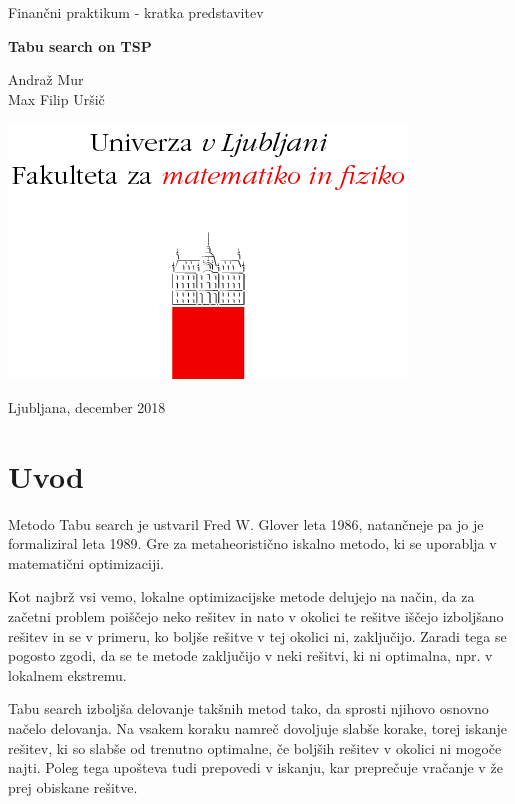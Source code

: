 \documentclass[10pt, a4paper]{article}
\begin{document}
\begin{titlepage}
\begin{center}
\vspace*{1cm}

\Large
Finančni praktikum - kratka predstavitev

\vspace{0.5cm}
\LARGE
\textbf{Tabu search on TSP}

\vspace{1.5cm}
\Large
Andraž Mur \\
Max Filip Uršič

\vspace{3cm}
\includegraphics[scale=1]{logo}


\vfill

\large Ljubljana, december 2018

\end{center}
\end{titlepage}


\section{Uvod}

Metodo Tabu search je ustvaril Fred W. Glover leta 1986, natančneje pa jo je formaliziral leta 1989. Gre za metaheoristično iskalno metodo, ki se uporablja v matematični optimizaciji.

Kot najbrž vsi vemo, lokalne optimizacijske metode delujejo na način, da za začetni problem poiščejo neko rešitev in nato v okolici te rešitve iščejo izboljšano rešitev in se v primeru, ko boljše rešitve v tej okolici ni, zaključijo. Zaradi tega se pogosto zgodi, da se te metode zaključijo v neki rešitvi, ki ni optimalna, npr. v lokalnem ekstremu.

Tabu search izboljša delovanje takšnih metod tako, da sprosti njihovo osnovno načelo delovanja. Na vsakem koraku namreč dovoljuje slabše korake, torej iskanje rešitev, ki so slabše od trenutno optimalne, če boljših rešitev v okolici ni mogoče najti. Poleg tega upošteva tudi prepovedi v iskanju, kar preprečuje vračanje v že prej obiskane rešitve.
\end{document}
